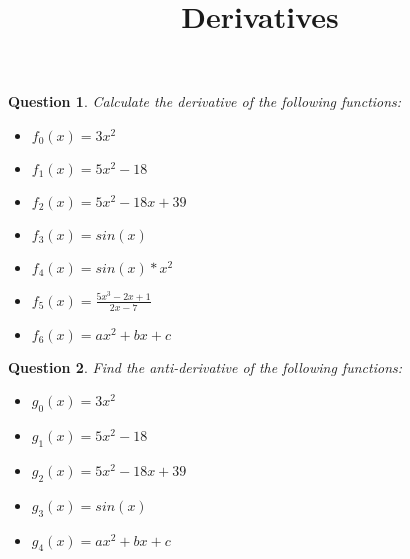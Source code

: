 \documentclass[]{article}
\title{Derivatives}
\author{}
\date{}
\newtheorem{question}{Question}
\begin{document}
	
	\maketitle
	
	
	\begin{question}
		Calculate the derivative of the following functions:\\
		\begin{itemize}
			\item $f_0(x) = 3x^2$
			\item $f_1(x) = 5x^2-18$
			\item $f_2(x) = 5x^2-18x+39$
			\item $f_3(x) = sin(x)$
			\item $f_4(x) = sin(x)*x^2$
			\item $f_5(x) = \frac{5x^3-2x+1}{2x-7}$
			\item $f_6(x) = ax^2+bx+c$
		\end{itemize}
	\end{question}
	
	\begin{question}
		Find the anti-derivative of the following functions:\\
		\begin{itemize}
			\item $g_0(x) = 3x^2$
			\item $g_1(x) = 5x^2-18$
			\item $g_2(x) = 5x^2-18x+39$
			\item $g_3(x) = sin(x)$
			\item $g_4(x) = ax^2+bx+c$
		\end{itemize}
	\end{question}
	
	
\end{document}
